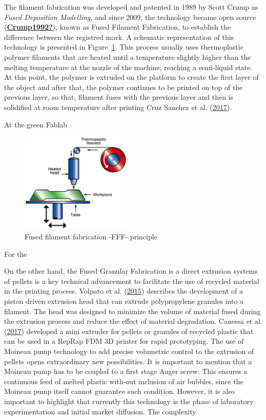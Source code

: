 \documentclass[
  11pt,
]{article}
\begin{document}
The filament fabrication was developed and patented in 1989 by Scott
Crump as \emph{Fused Deposition Modelling}, and since 2009, the
technology became open source
(\protect\hyperlink{ref-Crump1992}{\textbf{Crump1992?}}), known as Fused
Filament Fabrication, to establish the difference between the registred
mark. A schematic representation of this technology is presented in
Figure~\ref{fig-fff}. This process usually uses thermoplastic polymer
filaments that are heated until a temperature slightly higher than the
melting temperature at the nozzle of the machine, reaching a semi-liquid
state. At this point, the polymer is extruded on the platform to create
the first layer of the object and after that, the polymer continues to
be printed on top of the previous layer, so that, filament fuses with
the previous layer and then is solidified at room temperature after
printing Cruz Sanchez et al.
(\protect\hyperlink{ref-CruzSanchez2017}{2017}).

At the green Fablab

\begin{figure}[H]

{\centering \includegraphics[width=2.08333in,height=\textheight]{figures/FFF-00.png}

}

\caption{\label{fig-fff}Fused filament fabrication -FFF- principle}

\end{figure}

For the

On the other hand, the Fused Granular Fabrication is a direct extrusion
systems of pellets is a key technical advancement to facilitate the use
of recycled material in the printing process. Volpato et al.
(\protect\hyperlink{ref-Volpato2015}{2015}) describes the development of
a piston driven extrusion head that can extrude polypropylene granules
into a filament. The head was designed to minimize the volume of
material fused during the extrusion process and reduce the effect of
material degradation. Canessa et al.
(\protect\hyperlink{ref-Canessa2017}{2017}) developed a mini extruder
for pellets or granules of recycled plastic that can be used in a RepRap
FDM 3D printer for rapid prototyping. The use of Moineau pump technology
to add precise volumetric control to the extrusion of pellets opens
extraordinary new possibilities. It is important to mention that a
Moineau pump has to be coupled to a first stage Auger screw. This
ensures a continuous feed of melted plastic with-out inclusion of air
bubbles, since the Moineau pump itself cannot guarantee such condition.
However, it is also important to highlight that currently this
technology is the phase of laboratory experimentation and initial market
diffusion. The complexity
\end{document}
